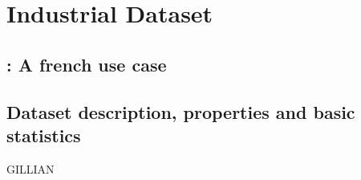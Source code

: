 \chapter{Industrial Dataset}
\label{chapter:dataset}



\section{\laprovence: A french use case}



\section{Dataset description, properties and basic statistics}


GILLIAN